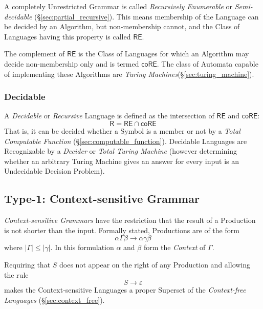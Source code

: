 A completely Unrestricted Grammar is called \emph{Recursively
  Enumerable} or \emph{Semi-decidable}
(\S\ref{sec:partial_recursive}). This means membership of the
Language can be decided by an Algorithm, but non-membership cannot,
and the Class of Languages having this property is called
$\mathsf{RE}$.

The complement of $\mathsf{RE}$ is the Class of Languages for which an
Algorithm may decide non-membership only and is termed
$\mathsf{coRE}$. The class of Automata capable of implementing these
Algorithms are \emph{Turing Machines}(\S\ref{sec:turing_machine}).



\subsubsection{Decidable}\label{sec:decidable_language}

A \emph{Decidable} or \emph{Recursive} Language is defined as the
intersection of $\mathsf{RE}$ and $\mathsf{coRE}$:
\[
    \mathsf{R} = \mathsf{RE} \cap \mathsf{coRE}
\]
That is, it can be decided whether a Symbol is a member or not by a
\emph{Total Computable Function} (\S\ref{sec:computable_function}).
Decidable Languages are Recognizable by a \emph{Decider} or
\emph{Total Turing Machine}\cite{kozen97} (however determining whether
an arbitrary Turing Machine gives an answer for every input is an
Undecidable Decision Problem).



\subsection{Type-1: Context-sensitive Grammar}\label{sec:context_sensitive}

\emph{Context-sensitive Grammars} have the restriction that the result
of a Production is not shorter than the input. Formally stated,
Productions are of the form
\[
    \alpha \Gamma \beta \rightarrow \alpha \gamma \beta
\]
where $|\Gamma| \leq |\gamma|$. In this formulation $\alpha$ and
$\beta$ form the \emph{Context} of $\Gamma$.

Requiring that $S$ does not appear on the right of any Production
and allowing the rule
\[
    S \rightarrow \varepsilon
\]
makes the Context-sensitive Languages a proper Superset of the
\emph{Context-free Languages} (\S\ref{sec:context_free}).


